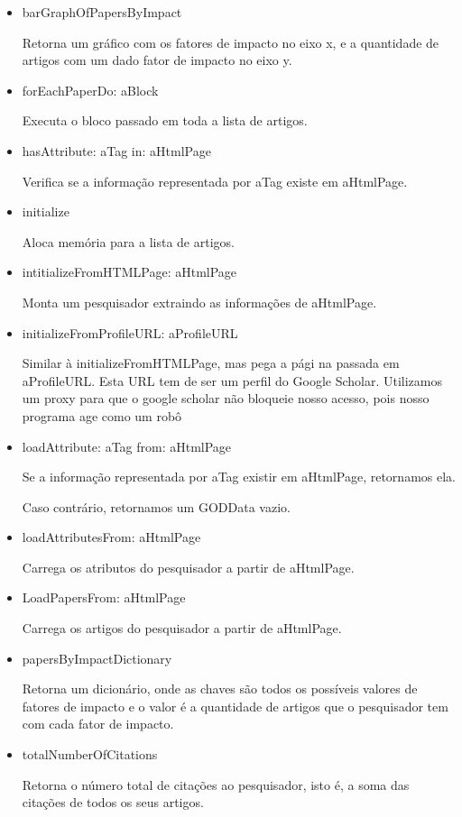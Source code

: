 \begin{itemize}
  \item barGraphOfPapersByImpact

  Retorna um gráfico com os fatores de impacto no eixo x, e a quantidade de artigos com um  dado fator de impacto no eixo y.

  \item forEachPaperDo: aBlock

  Executa o bloco passado em toda a lista de artigos.

  \item hasAttribute: aTag in: aHtmlPage

  Verifica se a informação representada por aTag existe em aHtmlPage.

  \item initialize

  Aloca memória para a lista de artigos.

  \item intitializeFromHTMLPage: aHtmlPage

  Monta um pesquisador extraindo as informações de aHtmlPage.

  \item initializeFromProfileURL: aProfileURL

  Similar à initializeFromHTMLPage, mas pega a pági na passada em aProfileURL. Esta URL   tem de ser um perfil do Google Scholar. Utilizamos um proxy para que o google scholar não   bloqueie nosso acesso, pois nosso programa age como um robô

  \item loadAttribute: aTag from: aHtmlPage

  Se a informação representada por aTag existir em aHtmlPage, retornamos ela.

  Caso contrário, retornamos um GODData vazio.

  \item loadAttributesFrom: aHtmlPage

  Carrega os atributos do pesquisador a partir de aHtmlPage.

  \item LoadPapersFrom: aHtmlPage

  Carrega os artigos do pesquisador a partir de aHtmlPage.


  \item papersByImpactDictionary

  Retorna um dicionário, onde as chaves são todos os possíveis valores de  fatores de impacto   e o valor é a quantidade de artigos que o pesquisador tem com cada fator de impacto.

  \item totalNumberOfCitations

  Retorna o número total de citações ao pesquisador, isto é, a soma das citações de todos os  seus artigos.

\end{itemize}

